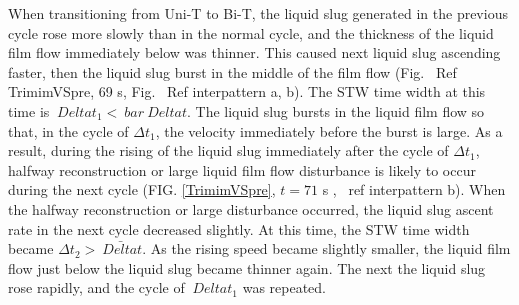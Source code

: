 \documentclass[aps,pre,preprint,groupedaddress,showkeys]{revtex4-2}
\begin{document}
When transitioning from Uni-T to Bi-T, the liquid slug generated in the previous cycle rose more slowly than in the normal cycle, and the thickness of the liquid film flow immediately below was thinner.
This caused next liquid slug ascending faster, then the liquid slug burst in the middle of the film flow (Fig. \ Ref {TrimimVSpre}, 69 s, Fig. \ Ref {interpattern} a, b).
The STW time width at this time is $ \ Delta t_ {1} <\ bar {\ Delta t} $.
The liquid slug bursts in the liquid film flow so that, in the cycle of $ \Delta t_ {1} $, the velocity immediately before the burst is large.
As a result, during the rising of the liquid slug immediately after the cycle of $ \Delta t_ {1} $, halfway reconstruction or large liquid film flow disturbance is likely to occur during the next cycle (FIG. \ref{TrimimVSpre}, $ t = 71 $ s , \ ref {interpattern} b).
When the halfway reconstruction or large disturbance occurred, the liquid slug ascent rate in the next cycle decreased slightly.
At this time, the STW time width became $ \Delta t_ {2}> \bar{\ Delta t} $. 
As the rising speed became slightly smaller, the liquid film flow just below the liquid slug became thinner again.
The next the liquid slug rose rapidly, and the cycle of $ \ Delta t_ {1} $ was repeated.
\end{document}
